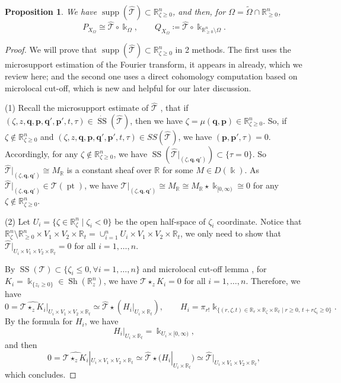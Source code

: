 \documentclass[11pt]{amsart}
\numberwithin{equation}{section}
\theoremstyle{plain}
\newtheorem{Prop}[prop]{Proposition}
\theoremstyle{definition}
\theoremstyle{remark}
\newcommand{\bR} { {\mathbb{R}}}
\newcommand{\sT} { {\mathscr{T}}}
\newcommand{\supp}{{\operatorname{supp}}}
\newcommand{\pt}{{\operatorname{pt}}}
\newcommand{\bq} { {\textbf{q}}}
\newcommand{\bp} { {\textbf{p}}}
\newcommand{\Sh} { {\operatorname{Sh}}}
\newcommand\ms{\operatorname{SS}}
\newcommand\msnz{ \dot{\operatorname{SS} }}
\begin{document}
\begin{Prop}\label{prop: extension independence in toric kernel}
We have $\supp(\widehat{\mathcal{T}}) \subset \bR^n_{\zeta\geq 0}$, and then, for $\Omega=\widetilde{\Omega}\cap \bR^n_{\geq 0}$, 
\[P_{X_{\Omega}}\cong \widehat{\mathcal{T}}\circ {\Bbbk }_{{\Omega}} ,\qquad Q_{X_{\Omega}}\coloneqq \widehat{\mathcal{T}}\circ {\Bbbk }_{\bR^n_{\geq 0}\setminus{\Omega}}.\]  
\end{Prop}
\begin{proof}We will prove that $\supp(\widehat{\mathcal{T}}) \subset \bR^n_{\zeta\geq 0}$ in 2 methods. The first uses the microsupport estimation of the Fourier transform, it appears in \cite[After Proposition 3.3]{Capacities2021} already, which we review here; and the second one uses a direct cohomology computation based on microlocal cut-off, which is new and helpful for our later discussion.

(1) Recall the microsupport estimate of $\widehat{\mathcal{T}}$ \cite[Equation (2.4)]{Capacities2021}, that if $(\zeta,z,\bq,\bp,\bq',\bp',t,\tau)\in \msnz(\widehat{\mathcal{T}})$, then we have $\zeta=\mu(\bq,\bp)\in \bR^n_{\zeta\geq 0}$. So, if $\zeta\notin \bR^n_{\zeta\geq 0}$ and $(\zeta,z,\bq,\bp,\bq',\bp',t,\tau)\in SS(\widehat{\mathcal{T}})$, we have $(\bp,\bp',\tau)=0$. Accordingly, for any $\zeta\notin \bR^n_{\zeta\geq 0}$, we have $\ms(\widehat{\mathcal{T}}|_{(\zeta,\bq,\bq')})\subset \{\tau= 0\}$. So $\widehat{\mathcal{T}}|_{(\zeta,\bq,\bq')}\cong M_\bR$ is a constant sheaf over $\bR$ for some $M\in D(\Bbbk )$.
As $\widehat{\mathcal{T}}|_{(\zeta,\bq,\bq')}\in \sT(\pt)$, we have $\widehat{\mathcal{T}}|_{(\zeta,\bq,\bq')}\cong M_\bR\cong M_\bR\star \Bbbk _{[0,\infty)} \cong 0 $ for any $\zeta\notin \bR^n_{\zeta\geq 0}$.


(2) Let $U_i=\{\zeta\in \bR_\zeta^n\mid\zeta_i<0\}$ be the open half-space of $\zeta_i$ coordinate. Notice that $ \bR_\zeta^n\setminus \bR_{\geq 0}^n \times V_1 \times V_2\times \bR_t=\cup_{i=1}^n U_i \times V_1 \times V_2\times \bR_t$, we only need to show that $\widehat{\mathcal{T}}|_{U_i\times V_1\times V_2\times  \bR_t}=0$ for all $i=1,\dots,n$.

By $\ms(\mathcal{T})\subset \{\zeta_i\leq 0, \forall i=1,\dots, n\}$ and microlocal cut-off lemma \cite[Proposition 5.2.1]{KS90}, for $K_i=\Bbbk_{\{z_i\geq 0\}}\in \Sh(\bR_z^n)$, we have $\mathcal{T}\star_z K_i=0$ for all $i=1,\dots, n$. Therefore, we have
\[0=\widehat{\mathcal{T}\star_z K_i}|_{U_i\times V_1\times V_2\times  \bR_t}\simeq \widehat{\mathcal{T}}\star (H_i|_{U_i\times \bR_t}),\qquad H_i=\pi_{r!}\Bbbk_{\{(r,\zeta,t)\in \bR_r\times \bR_\zeta\times \bR_t\mid r\geq 0,\, t+r\zeta_i\geq 0 \}}.\]
By the formula for $H_i$, we have 
\[H_i|_{U_i\times \bR_t}=\Bbbk_{U_i\times [0,\infty)},\]
and then
\[0=\widehat{\mathcal{T}\star_z K_i}|_{U_i\times V_1\times V_2\times  \bR_t}\simeq \widehat{\mathcal{T}}\star (H_i|_{U_i\times \bR_t})\simeq \widehat{\mathcal{T}}|_{U_i\times V_1 \times V_2 \times \bR_t},\]
which concludes.
\end{proof}
\end{document}
